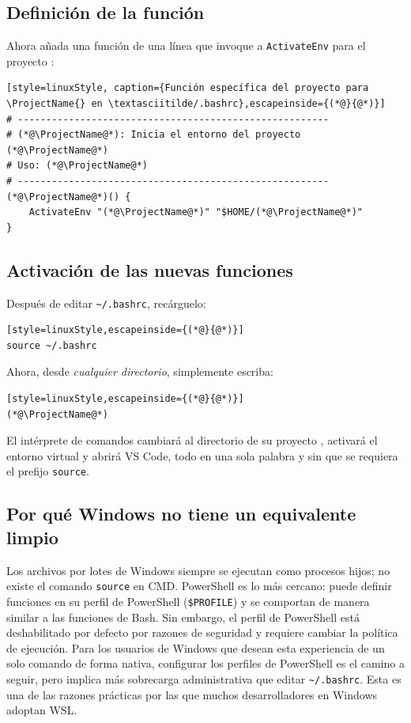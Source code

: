 \subsection{Definición de la función \ProjectName{}}

Ahora añada una función de una línea que invoque a \texttt{ActivateEnv}
para el proyecto \ProjectName{}:

\begin{lstlisting}[style=linuxStyle, caption={Función específica del proyecto para \ProjectName{} en \textasciitilde/.bashrc},escapeinside={(*@}{@*)}]
# -------------------------------------------------------
# (*@\ProjectName@*): Inicia el entorno del proyecto (*@\ProjectName@*)
# Uso: (*@\ProjectName@*)
# -------------------------------------------------------
(*@\ProjectName@*)() {
    ActivateEnv "(*@\ProjectName@*)" "$HOME/(*@\ProjectName@*)"
}
\end{lstlisting}

\subsection{Activación de las nuevas funciones}

Después de editar \texttt{\textasciitilde/.bashrc}, recárguelo:

\begin{lstlisting}[style=linuxStyle,escapeinside={(*@}{@*)}]
source ~/.bashrc
\end{lstlisting}

Ahora, desde \emph{cualquier directorio}, simplemente escriba:

\begin{lstlisting}[style=linuxStyle,escapeinside={(*@}{@*)}]
(*@\ProjectName@*)
\end{lstlisting}

El intérprete de comandos cambiará al directorio de su proyecto \ProjectName{},
activará el entorno virtual y abrirá VS Code, todo en una sola palabra y
sin que se requiera el prefijo \texttt{source}.

\subsection{Por qué Windows no tiene un equivalente limpio}

Los archivos por lotes de Windows siempre se ejecutan como procesos hijos;
no existe el comando \texttt{source} en CMD. PowerShell es lo más cercano:
puede definir funciones en su perfil de PowerShell (\texttt{\$PROFILE}) y
se comportan de manera similar a las funciones de Bash. Sin embargo, el
perfil de PowerShell está deshabilitado por defecto por razones de
seguridad y requiere cambiar la política de ejecución. Para los usuarios
de Windows que desean esta experiencia de un solo comando de forma nativa,
configurar los perfiles de PowerShell es el camino a seguir, pero implica
más sobrecarga administrativa que editar
\texttt{\textasciitilde/.bashrc}. Esta es una de las razones prácticas
por las que muchos desarrolladores en Windows adoptan WSL.

